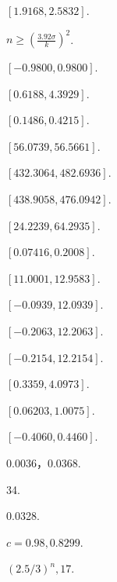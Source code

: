 \begin{answer}
  \item $[1.9168,2.5832]$.
  \item $n\ge\left(\frac{3.92\sigma}k\right)^2$.
  \item \begin{enumerate*}
    \item $[-0.9800,0.9800]$.
    \item $[0.6188,4.3929]$.
  \end{enumerate*}
  \item \begin{enumerate*}
    \item $[0.1486,0.4215]$.
    \item $[56.0739,56.5661]$.
  \end{enumerate*}
  \item \begin{enumerate*}
    \item $[432.3064,482.6936]$.
    \item $[438.9058,476.0942]$.
    \item $[24.2239,64.2935]$.
  \end{enumerate*}
  \item $[0.07416,0.2008]$.
  \setcounter{enumi}{7}
  \item $[11.0001,12.9583]$.
  \item \begin{enumerate*}
    \item $[-0.0939,12.0939]$.
    \item $[-0.2063,12.2063]$.
    \item $[-0.2154,12.2154]$.
    \item $[0.3359,4.0973]$.
  \end{enumerate*}
  \item \begin{enumerate*}
    \item $[0.06203,1.0075]$.
    \item $[-0.4060,0.4460]$.
  \end{enumerate*}
\end{answer}

\begin{answer}
  \item \begin{enumerate*}
    \item 0.0036，0.0368.
    \item 34.
  \end{enumerate*}
  \item 0.0328.
  \item $c=0.98,0.8299$.
  \item $(2.5/3)^n,17$.
\end{answer}

